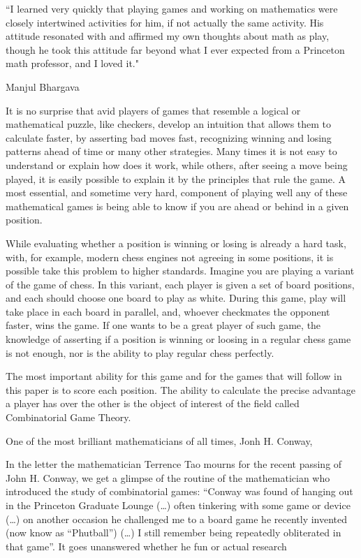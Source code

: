 \renewcommand{\textflush}{flushepinormal}
\setlength{}
\epigraph{``I learned very quickly that playing games and working on mathematics were closely intertwined activities for him, if not actually the same activity. His attitude resonated with and affirmed my own thoughts about math as play, though he took this attitude far beyond what I ever expected from a Princeton math professor, and I loved it."}{Manjul Bhargava \footnotemark}


It is no surprise that avid players of games that resemble a logical or mathematical puzzle, like checkers, develop an intuition that allows them to calculate faster, by asserting bad moves fast, recognizing winning and losing patterns ahead of time or many other strategies. Many times it is not easy to understand or explain how does it work, while others, after seeing a move being played, it is easily possible to explain it by the principles that rule the game. A most essential, and sometime very hard, component of playing well any of these mathematical games is being able to know if you are ahead or behind in a given position.

While evaluating whether a position is winning or losing is already a hard task, with, for example, modern chess engines not agreeing in some positions, it is possible take this problem to higher standards. Imagine you are playing a variant of the game of chess. In this variant, each player is given a set of board positions, and each should choose one board to play as white. During this game, play will take place in each board in parallel, and, whoever checkmates the opponent faster, wins the game. If one wants to be a great player of such game, the knowledge of asserting if a position is winning or loosing in a regular chess game is not enough, nor is the ability to play regular chess perfectly.

The most important ability for this game and for the games that will follow in this paper is to score each position. The ability to calculate the precise advantage a player has over the other is the object of interest of the field called Combinatorial Game Theory.

One of the most brilliant mathematicians of all times, Jonh H. Conway, 


In the letter the mathematician Terrence Tao mourns for the recent passing of John H. Conway, we get a glimpse of the routine of the mathematician who introduced the study of combinatorial games: “Conway was found of hanging out in the Princeton Graduate Lounge (…) often tinkering with some game or device (…) on another occasion he challenged me to a board game he recently invented (now know as “Phutball”) (…) I still remember being repeatedly obliterated in that game”.  It goes unanswered whether he fun or actual research



